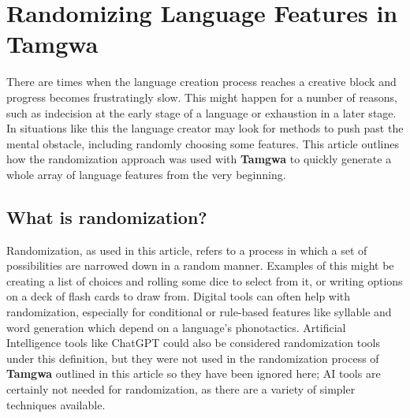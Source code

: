 \documentclass[a4paper,12pt,twoside,openright]{memoir}
\begin{document}


\chapter[Randomizing Language Features][Tamgwa]{Randomizing Language Features in Tamgwa}


\thispagestyle{fancy}
\BgUsetrue


    There are times when the language creation process reaches a creative block and progress becomes frustratingly slow.  This might happen for a number of reasons, such as indecision at the early stage of a language or exhaustion in a later stage.  In situations like this the language creator may look for methods to push past the mental obstacle, including randomly choosing some features.  This article outlines how the randomization approach was used with \textbf{Tamgwa} to quickly generate a whole array of language features from the very beginning.

\section*{What is randomization?} %

    Randomization, as used in this article, refers to a process in which a set of possibilities are narrowed down in a random manner.  Examples of this might be creating a list of choices and rolling some dice to select from it, or writing options on a deck of flash cards to draw from.  Digital tools can often help with randomization, especially for conditional or rule-based features like syllable and word generation which depend on a language's phonotactics.  Artificial Intelligence tools like ChatGPT could also be considered randomization tools under this definition, but they were not used in the randomization process of \textbf{Tamgwa} outlined in this article so they have been ignored here; AI tools are certainly not needed for randomization, as there are a variety of simpler techniques available.
\end{document}
